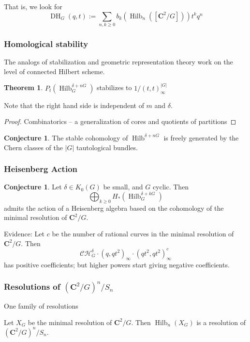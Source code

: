 \documentclass{amsart}[12pt]
\theoremstyle{definition}
\newtheorem{theorem}[dummy]{Theorem}
\newtheorem{conjecture}[dummy]{Conjecture}
\newcommand{\C}{\mathbf{C}}
\DeclareMathOperator{\Hilb}{Hilb}
\DeclareMathOperator{\DC}{DH}
\begin{document}
That is, we look for 
$$\DC_G(q,t):=\sum_{n,k\geq 0 } b_k(\Hilb_n([\C^2/G])) t^kq^n$$







\subsubsection{Homological stability}

The analogs of stabilization and geometric representation theory work on the level of connected Hilbert scheme.

\begin{theorem} 
$P_t(\Hilb^{\delta+nG}_G)$ stabilizes to $1/(t,t)_\infty^{|G|}$
\end{theorem}
Note that the right hand side is independent of $m$ and $\delta$.
\begin{proof} Combinatorics -- a generalization of cores and quotients of partitions \end{proof}

\begin{conjecture}
The stable cohomology of $\Hilb^{\delta+nG}$ is freely generated by the Chern classes of the $|G|$ tautological bundles.
\end{conjecture}



\subsubsection{Heisenberg Action}


\begin{conjecture}
Let $\delta\in K_0(G)$ be small, and $G$ cyclic.  Then
$$\bigoplus_{k\geq 0} H_*(\Hilb^{\delta+kG}_G)$$ admits the action of a Heisenberg algebra based on the cohomology of the minimal resolution of $\C^2/G$.
\end{conjecture}

Evidence:
Let $c$ be the number of rational curves in the minimal resolution of $\C^2/G$.  Then
$$\mathcal{CH}^\delta_G\cdot(q,qt^2)_\infty\cdot (qt^2,qt^2)_\infty^c$$
has positive coefficients; but higher powers start giving negative coefficients.


\subsubsection{Resolutions of $(\C^2/G)^n/S_n$}
One family of resolutions

Let $X_G$ be the minimal resolution of $\C^2/G$.  Then $\Hilb_n(X_G)$ is a resolution of $(\C^2/G)^n/S_n$.
\end{document}
